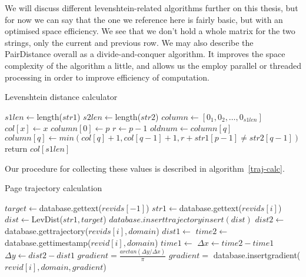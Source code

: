 We will discuss different levenshtein-related algorithms further on
this thesis, but for now we can say that the one we reference here is
fairly basic, but with an optimised space efficiency. We see that we
don't hold a whole matrix for the two strings, only the current and
previous row. We may also describe the PairDistance overall as a
divide-and-conquer algorithm. It improves the space complexity of the
algorithm a little, and allows us the employ parallel or threaded
processing in order to improve efficiency of computation.

\begin{algorithm}
  \caption{Levenshtein distance calculator}\label{lev-dist}
  \begin{algorithmic}
    \State $s1len \gets $length($str1$)
    \State $s2len \gets $length($str2$)
    \State $column \gets [0_{1}, 0_{2}, \ldots, 0_{s1len}]$
    \State $col[x] \gets x$
    \EndFor
    \State $column[0] \gets p$
    \State $r \gets p-1$
    \State $oldnum \gets column[q]$
    \State $column[q] \gets min(col[q]+1, col[q-1] + 1, r + str1[p-1] \neq str2[q-1])$
    \EndFor
    \EndFor
    \State return $col[s1len]$
    \EndFunction
  \end{algorithmic}
\end{algorithm}

Our procedure for collecting these values is described in
algorithm~\ref{traj-calc}.

\begin{algorithm}
\caption{Page trajectory calculation}\label{traj-calc}
  \begin{algorithmic}
    \State $target \gets $database.gettext($revids[-1]$)
    \State $str1 \gets $database.gettext($revids[i]$)
    \State $dist \gets $LevDist($str1, target$)
    \State $database.inserttrajectoryinsert(dist)$    
    \EndIf
    \EndFor
    \State $dist2 \gets $database.gettrajectory($revids[i],domain$)
    \State $dist1 \gets$
    \State $time2 \gets $database.gettimestamp($revid[i],domain$)
    \State $time1 \gets $
    \State ${\Delta}x \gets time2 - time1$
    \State ${\Delta}y \gets dist2 - dist1$
    \State $gradient = \frac{arctan({\Delta}y/{\Delta}x)}{\pi}$ 
    \State $gradient = $
    \EndIf
    \State database.insertgradient($revid[i],domain,gradient$)
    \EndFor
    \EndProcedure
  \end{algorithmic}
\end{algorithm}
